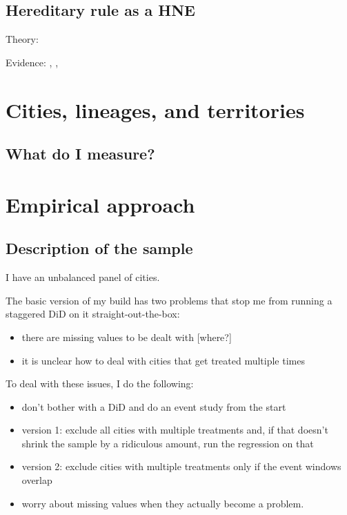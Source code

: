 \documentclass{article}
\begin{document}

\subsection{Hereditary rule as a HNE}

Theory: \cite{besley2017}

Evidence: \cite{olken2005}, \cite{dube2020}, \cite{ottinger2022}


\section{Cities, lineages, and territories}


\subsection{What do I measure?}


\section{Empirical approach}


\subsection{Description of the sample}

I have an unbalanced panel of cities.

The basic version of my build has two problems that stop me from running a staggered DiD on it straight-out-the-box:
\begin{itemize}
    \item there are missing values to be dealt with [where?]
    \item it is unclear how to deal with cities that get treated multiple times    
\end{itemize}

To deal with these issues, I do the following:
\begin{itemize}
    \item don't bother with a DiD and do an event study from the start
    \item version 1: exclude all cities with multiple treatments and, if that doesn't shrink the sample by a ridiculous amount, run the regression on that
    \item version 2: exclude cities with multiple treatments only if the event windows overlap
    \item worry about missing values when they actually become a problem.
\end{itemize}
\end{document}
